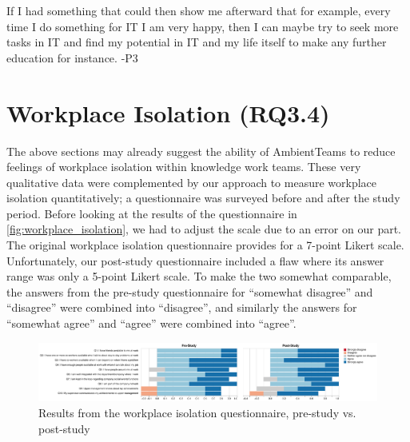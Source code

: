 \begin{displayquote}
    If I had something that could then show me afterward that for example, every time I do something for IT I am very happy, then I can maybe try to seek more tasks in IT and find my potential in IT and my life itself to make any further education for instance. -P3
\end{displayquote}

\section{Workplace Isolation (RQ3.4)}
\label{section:workplace_isolation}

The above sections may already suggest the ability of AmbientTeams to reduce feelings of workplace isolation within knowledge work teams. These very qualitative data were complemented by our approach to measure workplace isolation quantitatively; a questionnaire was surveyed before and after the study period. Before looking at the results of the questionnaire in \autoref{fig:workplace_isolation}, we had to adjust the scale due to an error on our part. The original workplace isolation questionnaire provides for a 7-point Likert scale. Unfortunately, our post-study questionnaire included a flaw where its answer range was only a 5-point Likert scale. To make the two somewhat comparable, the answers from the pre-study questionnaire for \enquote{somewhat disagree} and \enquote{disagree} were combined into \enquote{disagree}, and similarly the answers for \enquote{somewhat agree} and \enquote{agree} were combined into \enquote{agree}.

\begin{figure}[h]
    \centering
    \includegraphics[width=\linewidth]{plots/workplace_isolation_likert.pdf}
    \caption{Results from the workplace isolation questionnaire, pre-study vs. post-study}
    \label{fig:workplace_isolation}
\end{figure}


